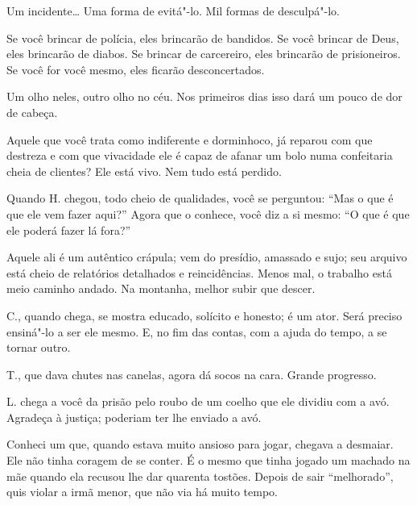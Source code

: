 Um incidente\ldots{} Uma forma de evitá"-lo. Mil formas de desculpá"-lo.

\bigskip
\bigskip

Se você brincar de polícia, eles brincarão de bandidos. Se você brincar
de Deus, eles brincarão de diabos. Se brincar de carcereiro, eles
brincarão de prisioneiros. Se você for você mesmo, eles ficarão
desconcertados.

\bigskip
\bigskip

Um olho neles, outro olho no céu. Nos primeiros dias isso dará um pouco
de dor de cabeça.

\bigskip
\bigskip

Aquele que você trata como indiferente e dorminhoco, já reparou com que
destreza e com que vivacidade ele é capaz de afanar um bolo numa
confeitaria cheia de clientes? Ele está vivo. Nem tudo está perdido.

\bigskip
\bigskip

Quando H. chegou, todo cheio de qualidades, você se perguntou: ``Mas o
que é que ele vem fazer aqui?'' Agora que o conhece, você diz a si
mesmo: ``O que é que ele poderá fazer lá fora?''

\bigskip
\bigskip

Aquele ali é um autêntico crápula; vem do presídio, amassado e sujo; seu
arquivo está cheio de relatórios detalhados e reincidências. Menos mal,
o trabalho está meio caminho andado. Na montanha, melhor subir que
descer.

\bigskip
\bigskip

C., quando chega, se mostra educado, solícito e honesto; é um ator. Será
preciso ensiná"-lo a ser ele mesmo. E, no fim das contas, com a ajuda do
tempo, a se tornar outro.

\bigskip
\bigskip

T., que dava chutes nas canelas, agora dá socos na cara. Grande
progresso.

\bigskip
\bigskip

L. chega a você da prisão pelo roubo de um coelho que ele dividiu com a
avó. Agradeça à justiça; poderiam ter lhe enviado a avó.

\bigskip
\bigskip

Conheci um que, quando estava muito ansioso para jogar, chegava a
desmaiar. Ele não tinha coragem de se conter. É o mesmo que tinha jogado
um machado na mãe quando ela recusou lhe dar quarenta tostões. Depois de
sair ``melhorado'', quis violar a irmã menor, que não via há muito
tempo.

\bigskip
\bigskip

